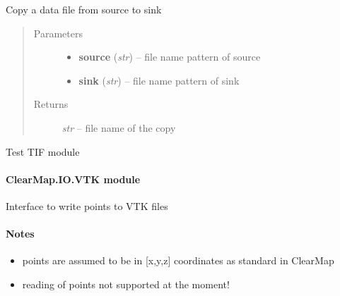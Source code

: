 \documentclass[letterpaper,10pt,english]{sphinxmanual}
\begin{document}

\begin{fulllineitems}
\label{api/ClearMap.IO:ClearMap.IO.TIF.copyData}
Copy a data file from source to sink
\begin{quote}\begin{description}
\item[{Parameters}] \leavevmode\begin{itemize}
\item {} 
\textbf{source} (\emph{str}) --
file name pattern of source

\item {} 
\textbf{sink} (\emph{str}) --
file name pattern of sink

\end{itemize}

\item[{Returns}] \leavevmode
\emph{str} --
file name of the copy

\end{description}\end{quote}

\end{fulllineitems}


\begin{fulllineitems}
\label{api/ClearMap.IO:ClearMap.IO.TIF.test}
Test TIF module

\end{fulllineitems}



\paragraph{ClearMap.IO.VTK module}
\label{api/ClearMap.IO:module-ClearMap.IO.VTK}\label{api/ClearMap.IO:clearmap-io-vtk-module}
Interface to write points to VTK files
\paragraph{Notes}
\begin{itemize}
\item {} 
points are assumed to be in {[}x,y,z{]} coordinates as standard in ClearMap

\item {} 
reading of points not supported at the moment!

\end{itemize}
\end{document}
